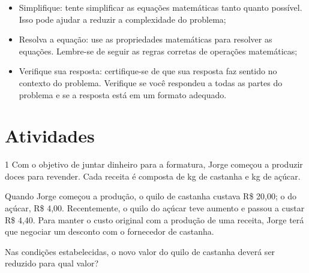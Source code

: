 \begin{escolha}
\begin{boxmedio}
\begin{boxmedio}
{\begin{boxpeq}
\begin{boxpeq}
{\begin{boxpeq}
\begin{boxmedio}
\begin{boxmedio}
\begin{boxpeq}
\begin{boxmedio}
\begin{boxpeq}
\begin{boxpeq}
\begin{boxpeq}
\begin{boxpeq}
{\begin{itemize}
  \item Simplifique: tente simplificar as equações matemáticas tanto
quanto possível. Isso pode ajudar a reduzir a complexidade do problema;

  \item Resolva a equação: use as propriedades matemáticas para resolver
as equações. Lembre-se de seguir as regras corretas de operações
matemáticas;

  \item Verifique sua resposta: certifique-se de que sua resposta faz
sentido no contexto do problema. Verifique se você respondeu a todas as
partes do problema e se a resposta está em um formato adequado.
\end{itemize}
}

\section{Atividades}

\num{1} Com o objetivo de juntar dinheiro para a formatura, Jorge começou a
produzir doces para revender. Cada receita é composta de  kg de 
castanha e  kg de açúcar.

Quando Jorge começou a produção, o quilo de castanha custava R\$ 20,00; o do
açúcar, R\$ 4,00. Recentemente, o quilo do açúcar teve aumento e passou a
custar R\$ 4,40. Para manter o custo original com a produção de uma receita, 
Jorge terá que negociar um desconto com o fornecedor de castanha.

Nas condições estabelecidas, o novo valor do quilo de castanha deverá ser
reduzido para qual valor?

\begin{boxmedio}
\end{boxmedio}
\end{boxpeq}
\end{boxpeq}
\end{boxpeq}
\end{boxpeq}
\end{boxmedio}
\end{boxpeq}
\end{boxmedio}
\end{boxmedio}
\end{boxpeq}}
\end{boxpeq}
\end{boxpeq}}
\end{boxmedio}
\end{boxmedio}
\end{escolha}
